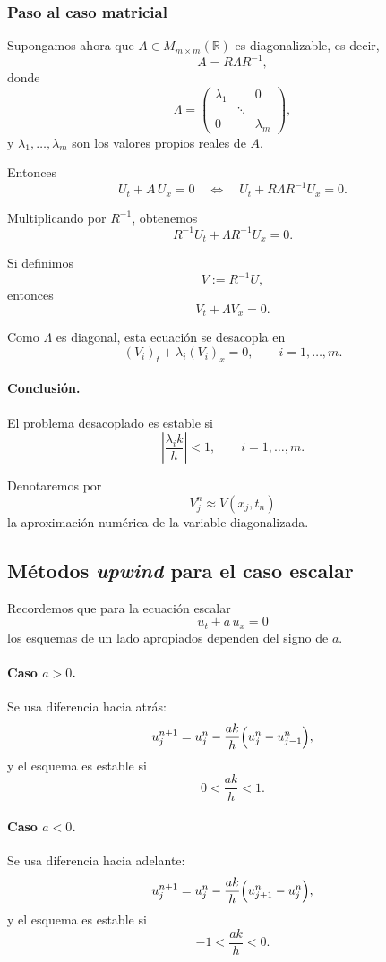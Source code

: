 \subsubsection{Paso al caso matricial}

Supongamos ahora que \(A\in M_{m\times m}(\mathbb{R})\) es diagonalizable, es decir,
\[
A=R\Lambda R^{-1},
\]
donde
\[
\Lambda=
\begin{pmatrix}
\lambda_1 &        & 0\\
          & \ddots &  \\
0         &        & \lambda_m
\end{pmatrix},
\]
y \(\lambda_1,\dots,\lambda_m\) son los valores propios reales de \(A\).

Entonces
\[
U_t+A\,U_x=0
\quad\Longleftrightarrow\quad
U_t+R\Lambda R^{-1}U_x=0.
\]

Multiplicando por \(R^{-1}\), obtenemos
\[
R^{-1}U_t+\Lambda R^{-1}U_x=0.
\]

Si definimos
\[
V:=R^{-1}U,
\]
entonces
\[
V_t+\Lambda V_x=0.
\]

Como \(\Lambda\) es diagonal, esta ecuación se desacopla en
\[
(V_i)_t+\lambda_i (V_i)_x=0,
\qquad i=1,\dots,m.
\]

\paragraph{Conclusión.}
El problema desacoplado es estable si
\[
\left|\frac{\lambda_i k}{h}\right|<1,
\qquad i=1,\dots,m.
\]

Denotaremos por
\[
V_j^n \approx V(x_j,t_n)
\]
la aproximación numérica de la variable diagonalizada.

\subsection{Métodos \emph{upwind} para el caso escalar}

Recordemos que para la ecuación escalar
\[
u_t+a\,u_x=0
\]
los esquemas de un lado apropiados dependen del signo de \(a\).

\paragraph{Caso \(a>0\).}
Se usa diferencia hacia atrás:
\[
u_j^{n+1}
=
u_j^n-\frac{ak}{h}\Bigl(u_j^n-u_{j-1}^n\Bigr),
\]
y el esquema es estable si
\[
0<\frac{ak}{h}<1.
\]

\paragraph{Caso \(a<0\).}
Se usa diferencia hacia adelante:
\[
u_j^{n+1}
=
u_j^n-\frac{ak}{h}\Bigl(u_{j+1}^n-u_j^n\Bigr),
\]
y el esquema es estable si
\[
-1<\frac{ak}{h}<0.
\]


